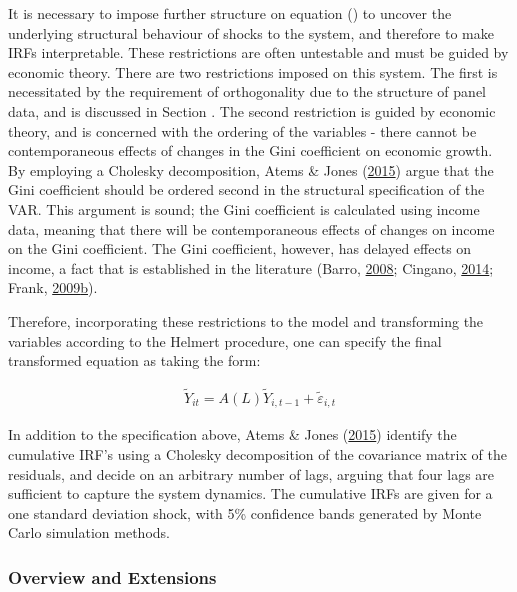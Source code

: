 \documentclass[11pt,preprint, authoryear]{elsarticle}
\numberwithin{equation}{section}
\numberwithin{figure}{section}
\numberwithin{table}{section}
\begin{document}
It is necessary to impose further structure on equation () to
uncover the underlying structural behaviour of shocks to the system, and
therefore to make IRFs interpretable. These restrictions are often
untestable and must be guided by economic theory. There are two
restrictions imposed on this system. The first is necessitated by the
requirement of orthogonality due to the structure of panel data, and is
discussed in Section . The second restriction is guided
by economic theory, and is concerned with the ordering of the variables
- there cannot be contemporaneous effects of changes in the Gini
coefficient on economic growth. By employing a Cholesky decomposition,
Atems \& Jones (\protect\hyperlink{ref-atems}{2015}) argue that the Gini
coefficient should be ordered second in the structural specification of
the VAR. This argument is sound; the Gini coefficient is calculated
using income data, meaning that there will be contemporaneous effects of
changes on income on the Gini coefficient. The Gini coefficient,
however, has delayed effects on income, a fact that is established in
the literature (Barro, \protect\hyperlink{ref-barro}{2008}; Cingano,
\protect\hyperlink{ref-cingano}{2014}; Frank,
\protect\hyperlink{ref-frankincome}{2009}\protect\hyperlink{ref-frankincome}{b}).

Therefore, incorporating these restrictions to the model and
transforming the variables according to the Helmert procedure, one can
specify the final transformed equation as taking the form:

\begin{align}\tag{2}
\tilde{Y}_{it} = A(L) \tilde{Y}_{i, t-1} + \tilde{\varepsilon}_{i,t} \label{eq2}
\end{align}

In addition to the specification above, Atems \& Jones
(\protect\hyperlink{ref-atems}{2015}) identify the cumulative IRF's
using a Cholesky decomposition of the covariance matrix of the
residuals, and decide on an arbitrary number of lags, arguing that four
lags are sufficient to capture the system dynamics. The cumulative IRFs
are given for a one standard deviation shock, with 5\% confidence bands
generated by Monte Carlo simulation methods.

\hypertarget{overview-and-extensions}{%
\subsubsection*{Overview and Extensions}\label{overview-and-extensions}}
\end{document}
